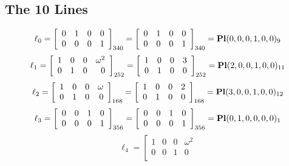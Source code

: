 \documentclass{article}
\begin{document}
{\subsection*{The 10 Lines}
$$
\ell_{0} = 
\left[
\begin{array}{*{4}{r}}
0 & 1 & 0 & 0\\
0 & 0 & 0 & 1\\
\end{array}
\right]
_{340}
=
\left[
\begin{array}{*{4}c}
0  & 1  & 0  & 0\\
0  & 0  & 0  & 1\\
\end{array}
\right]_{340}
={\rm\bf Pl}(0,0,0,1,0,0 )_{9}$$
$$
\ell_{1} = 
\left[
\begin{array}{*{4}{r}}
1 & 0 & 0 & \omega^{2}\\
0 & 1 & 0 & 0\\
\end{array}
\right]
_{252}
=
\left[
\begin{array}{*{4}c}
1  & 0  & 0  & 3\\
0  & 1  & 0  & 0\\
\end{array}
\right]_{252}
={\rm\bf Pl}(2,0,0,1,0,0 )_{11}$$
$$
\ell_{2} = 
\left[
\begin{array}{*{4}{r}}
1 & 0 & 0 & \omega \\
0 & 1 & 0 & 0\\
\end{array}
\right]
_{168}
=
\left[
\begin{array}{*{4}c}
1  & 0  & 0  & 2\\
0  & 1  & 0  & 0\\
\end{array}
\right]_{168}
={\rm\bf Pl}(3,0,0,1,0,0 )_{12}$$
$$
\ell_{3} = 
\left[
\begin{array}{*{4}{r}}
0 & 0 & 1 & 0\\
0 & 0 & 0 & 1\\
\end{array}
\right]
_{356}
=
\left[
\begin{array}{*{4}c}
0  & 0  & 1  & 0\\
0  & 0  & 0  & 1\\
\end{array}
\right]_{356}
={\rm\bf Pl}(0,1,0,0,0,0 )_{1}$$
$$
\ell_{4} = 
\left[
\begin{array}{*{4}{r}}
1 & 0 & 0 & \omega^{2}\\
0 & 0 & 1 & 0\\

\end{array}$$}
\end{document}

